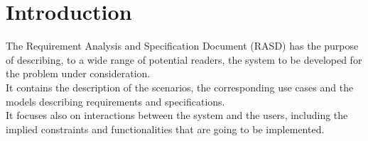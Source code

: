 \chapter{Introduction}

The Requirement Analysis and Specification Document (RASD) has the purpose of describing, to a wide range of potential readers, the system to be developed for the problem under consideration.\\ 
It contains the description of the scenarios, the corresponding use cases and the models describing requirements and specifications.\\
It focuses also on interactions between the system and the users, including the implied  constraints and functionalities that are going to be implemented.






